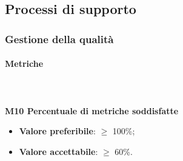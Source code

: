 			
	\subsection{Processi di supporto}		
		\subsubsection{Gestione della qualità}
			\paragraph{Metriche} \mbox{} \\ \\
				\textbf{M10 Percentuale di metriche soddisfatte}
				\begin{itemize}
					\item \textbf{Valore preferibile}: $\ge$ 100\%;
					\item \textbf{Valore accettabile}: $\ge$ 60\%.
				\end{itemize}


		  
			
				

